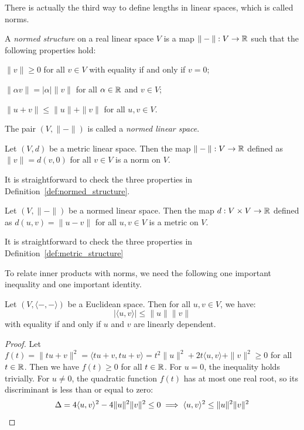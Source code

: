 There is actually the third way to define lengths in linear spaces, which is called norms.
\begin{definition}\label{def:normed_structure}
	A \emph{normed structure} on a real linear space $V$ is a map $\| - \| : V \to \operatorname{\mathbb{R}}$ such that the following properties hold:
	\begin{description}[labelwidth=\widthof{\bfseries Positive-definiteness:~}]
		\item[Positive-definiteness] $\| v \| \geq 0$ for all $v \in V$ with equality if and only if $v = 0$;
		\item[Homogeneity] $\| \alpha v \| = |\alpha| \| v \|$ for all $\alpha \in \operatorname{\mathbb{R}}$ and $v \in V$;
		\item[Triangle inequality] $\| u + v \| \leq \| u \| + \| v \|$ for all $u, v \in V$.
	\end{description}
	The pair $(V, \| - \|)$ is called a \emph{normed linear space}.
\end{definition}

\begin{proposition}
	Let $(V, d)$ be a metric linear space. Then the map $\| - \| : V \to \operatorname{\mathbb{R}}$ defined as $\| v \| = d(v, 0)$ for all $v \in V$ is a norm on $V$.
\end{proposition}
It is straightforward to check the three properties in Definition~\ref{def:normed_structure}.

\begin{proposition}
	Let $(V, \| - \|)$ be a normed linear space. Then the map $d : V \times V \to \operatorname{\mathbb{R}}$ defined as $d(u, v) = \| u - v \|$ for all $u, v \in V$ is a metric on $V$.
\end{proposition}
It is straightforward to check the three properties in Definition~\ref{def:metric_structure}

To relate inner products with norms, we need the following one important inequality and one important identity.

\begin{proposition}
	Let $(V, \langle -, - \rangle)$ be a Euclidean space. Then for all $u, v \in V$, we have:
	\[
		|\langle u, v \rangle| \leq \| u \| \| v \|
	\]
	with equality if and only if $u$ and $v$ are linearly dependent.
\end{proposition}
\begin{proof}
	Let $f(t) = \| tu + v \|^2 = \langle tu + v, tu + v \rangle = t^2 \| u \|^2 + 2t \langle u, v \rangle + \| v \|^2 \geq 0$ for all $t \in \operatorname{\mathbb{R}}$. Then we have $f(t) \geq 0$ for all $t \in \operatorname{\mathbb{R}}$. For $u = 0$, the inequality holds trivially. For $u \neq 0$, the quadratic function $f(t)$ has at most one real root, so its discriminant is less than or equal to zero:
	\[
		\Delta = 4 \langle u, v \rangle^2 - 4 \| u \|^2 \| v \|^2 \leq 0 \implies \langle u, v \rangle^2 \leq \| u \|^2 \| v \|^2 \qedhere
	\]
\end{proof}

